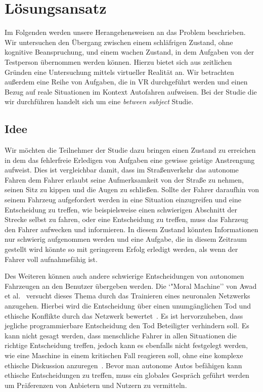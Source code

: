 \chapter{Lösungsansatz}\label{cha:approach}

Im Folgenden werden unsere Herangehensweisen an das Problem beschrieben. Wir untersuchen den Übergang zwischen einem schläfrigen Zustand, ohne kognitive Beanspruchung, und einem wachen Zustand, in dem Aufgaben von der Testperson übernommen werden können. Hierzu bietet sich aus zeitlichen Gründen eine Untersuchung mittels virtueller Realität an. Wir betrachten außerdem eine Reihe von Aufgaben, die in VR durchgeführt werden und einen Bezug auf reale Situationen im Kontext Autofahren aufweisen. Bei der Studie die wir durchführen handelt sich um eine \textit{between subject} Studie. 

\section{Idee}

Wir möchten die Teilnehmer der Studie dazu bringen einen Zustand zu erreichen in dem das fehlerfreie Erledigen von Aufgaben eine gewisse geistige Anstrengung aufweist. Dies ist vergleichbar damit, dass im Straßenverkehr das autonome Fahren dem Fahrer erlaubt seine Aufmerksamkeit von der Straße zu nehmen, seinen Sitz zu kippen und die Augen zu schließen. Sollte der Fahrer daraufhin von seinem Fahrzeug aufgefordert werden in eine Situation einzugreifen und eine Entscheidung zu treffen, wie beispielsweise einen schwierigen Abschnitt der Strecke selbst zu fahren, oder eine Entscheidung zu treffen, muss das Fahrzeug den Fahrer aufwecken und informieren. In diesem Zustand könnten Informationen nur schwierig aufgenommen werden und eine Aufgabe, die in diesem Zeitraum gestellt wird könnte so mit geringerem Erfolg erledigt werden, als wenn der Fahrer voll aufnahmefähig ist.

Des Weiteren können auch andere schwierige Entscheidungen von autonomen Fahrzeugen an den Benutzer übergeben werden. Die `"Moral Machine'' von Awad et al.~\cite{awad2018moral} versucht dieses Thema durch das Trainieren eines neuronalen Netzwerks anzugehen. Hierbei wird die Entscheidung über einen unumgänglichen Tod und ethische Konflikte durch das Netzwerk bewertet~\cite{awad2018moral}. Es ist hervorzuheben, dass jegliche programmierbare Entscheidung den Tod Beteiligter verhindern soll. 
Es kann nicht gesagt werden, dass menschliche Fahrer in allen Situationen die richtige Entscheidung treffen, jedoch kann es ebenfalls nicht festgelegt werden, wie eine Maschine in einem kritischen Fall reagieren soll, ohne eine komplexe ethische Diskussion anzuregen~\cite{awad2018moral}.
Bevor man autonome Autos befähigen kann ethische Entscheidungen zu treffen, muss ein globales Gespräch geführt werden um Präferenzen von Anbietern und Nutzern zu vermitteln.

